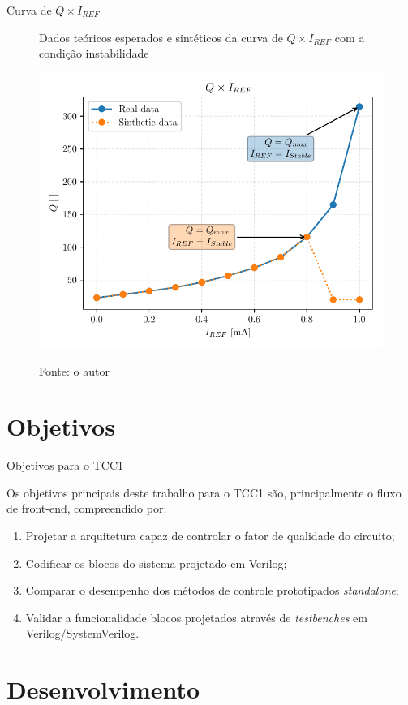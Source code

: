 \begin{frame}{Curva de $Q \times I_{REF}$}

\begin{figure}[H]
    \centering
    \caption{Dados teóricos esperados e sintéticos da curva de $Q \times I_{REF}$ com a condição instabilidade}
    \includegraphics[width=.5\textwidth]{fig/q-iref-instability-test.pdf}
    \label{f-inst-test-inicio}
    \caption*{Fonte: o autor}
\end{figure}
    
\end{frame}

\section{Objetivos}

\begin{frame}{Objetivos para o TCC1}

Os objetivos principais deste trabalho para o TCC1 são, principalmente o fluxo de front-end, compreendido por:

\begin{enumerate}
    \item Projetar a arquitetura capaz de controlar o fator de qualidade do circuito;
    \item Codificar os blocos do sistema projetado em Verilog;
    \item Comparar o desempenho dos métodos de controle prototipados \textit{standalone};
    \item Validar a funcionalidade blocos projetados através de \textit{testbenches} em Verilog/SystemVerilog.
\end{enumerate}

    
\end{frame}


\section{Desenvolvimento}

